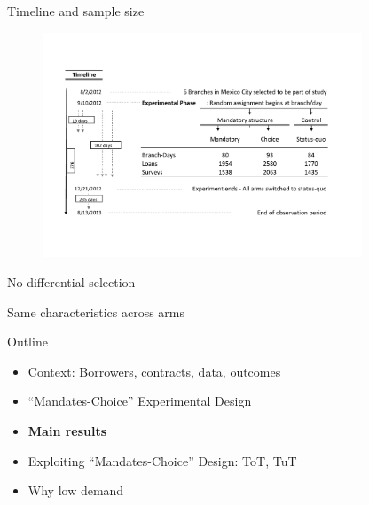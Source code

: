 \documentclass[9pt, aspectratio=169]{beamer}
\begin{document}
 \begin{frame}{Timeline and sample size}
\vspace{-.3in}
 \begin{figure}[H]
 \begin{center}
         \includegraphics[width=0.85\textwidth]{Figuras/consort.pdf}
   \end{center}
 \end{figure}
 \end{frame}


 

\begin{frame}{No differential selection}
\vspace{.2in}
    \begin{table}[H]
\label{attrition_table}
\begin{center}
\small{}
\end{center}
\end{table}
\end{frame}



\begin{frame}{Same characteristics across arms}
    \begin{table}[H]
\begin{center}
\resizebox{.55\textwidth}{!}{
\scriptsize{}
}
\end{center}
\end{table}
\end{frame}



\begin{frame}{Outline}
     \large   
     \begin{itemize}
        \item Context: Borrowers, contracts, data, outcomes
         \item \vfill ``Mandates-Choice'' Experimental Design
         \vfill\item \textbf{Main results}
          \vfill\item Exploiting ``Mandates-Choice'' Design: ToT, TuT
         \vfill\item Why low demand
         
     \end{itemize}
\end{frame}
\end{document}

